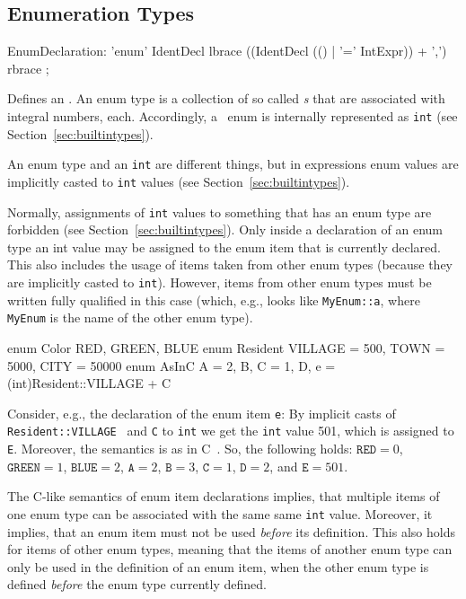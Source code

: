 \subsection{Enumeration Types}
\begin{rail}
  EnumDeclaration: 'enum' IdentDecl lbrace ((IdentDecl (() | '=' IntExpr)) + ',') rbrace ;
\end{rail}
Defines an .
An enum type is a collection of so called \emph{s} that are associated with integral numbers, each.
Accordingly, a \GrG\ enum is internally represented as \texttt{int} (see Section~\ref{sec:builtintypes}).
\begin{note}
	An enum type and an {\tt int} are different things, but in expressions enum values are implicitly casted to {\tt int} values 	(see Section~\ref{sec:builtintypes}).
\end{note}
\begin{note}
	Normally, assignments of {\tt int} values to something that has an enum type are forbidden (see Section~\ref{sec:builtintypes}).
	Only inside a declaration of an enum type an int value may be assigned to the enum item that is currently declared.
	This also includes the usage of items taken from other enum types (because they are implicitly casted to {\tt int}).
	However, items from other enum types must be written fully qualified in this case (which, e.g., looks like {\tt MyEnum::a}, where {\tt MyEnum} is the name of the other enum type).
\end{note}

\begin{example}
\begin{grgen}
enum Color {RED, GREEN, BLUE}
enum Resident {VILLAGE = 500, TOWN = 5000, CITY = 50000}
enum AsInC {A = 2, B, C = 1, D, e = (int)Resident::VILLAGE + C}
\end{grgen}
Consider, e.g., the declaration of the enum item {\tt e}:
By implicit casts of   {\tt Resident::VILLAGE } and {\tt C} to {\tt int} we get the {\tt int} value 501, which is assigned to {\tt E}.
Moreover, the semantics is as in C~\cite{Sch:1990:ANSIC}. So, the following holds: $\texttt{RED} = 0$, $\texttt{GREEN} = 1$, $\texttt{BLUE} = 2$, $\texttt{A}=2$, $\texttt{B}=3$, $\texttt{C}=1$, $\texttt{D}=2$, and $\texttt{E}=501$.
\end{example}
\begin{note}
	The C-like semantics of enum item declarations implies, that multiple items of one enum type can be associated with the same same {\tt int} value.
	Moreover, it implies, that an enum item must not be used \emph{before} its definition.
	This also holds for items of other enum types, meaning that the items of another enum type can only be used in the definition of an enum item, when the other enum type is defined \emph{before} the enum type currently defined.
\end{note}

